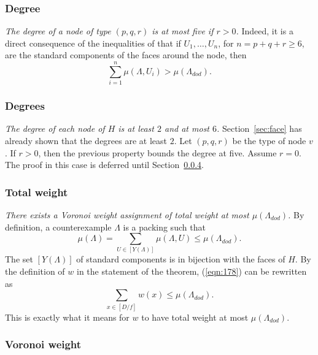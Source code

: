 \documentclass{article} %
\begin{document}
\subsubsection{Degree}

{\it The degree of a node of type $(p,q,r)$ is at most five if $r>0$.}
Indeed, it is a direct consequence of the inequalities of \cite{McLaughlin:2008:KeplerCode} that if $U_1,\ldots,U_n$, for $n=p+q+r\ge 6$, are the standard components of the faces around the node, then 
  $$
  \sum_{i=1}^n \mu(\Lambda,U_i) > \mu(\Lambda_{dod}).
  $$




\subsubsection{Degrees}\label{sec:degrees}

{\it The degree of each node of $H$ is at least $2$ and at most $6$.}
Section~\ref{sec:face} has already shown that the degrees are at least $2$.
Let $(p,q,r)$ be the type of node $v$.  If $r>0$, then the previous
property bounds the degree at five.  Assume $r=0$.  The
proof in this case is deferred until Section~\ref{sec:pq}.




\subsubsection{Total weight}

{\it There exists a Voronoi weight assignment of total weight at most $\mu(\Lambda_{dod})$.}
By definition, a counterexample $\Lambda$ is a packing such that
\begin{equation}\label{eqn:178}
\mu(\Lambda)=\sum_{U\in [Y(\Lambda)]} \mu(\Lambda,U) \le \mu(\Lambda_{dod}).
\end{equation}
The set  $[Y(\Lambda)]$ of standard components is in bijection with the faces of $H$.
By the definition of $w$ in the statement of the theorem, (\ref{eqn:178}) can
be rewritten as
$$
\sum_{x\in[D/f]} w(x) \le \mu(\Lambda_{dod}).
$$
This is exactly what it means for $w$ to have total weight at most $\mu(\Lambda_{dod})$.

\subsubsection{Voronoi weight}\label{sec:pq}
\end{document}
